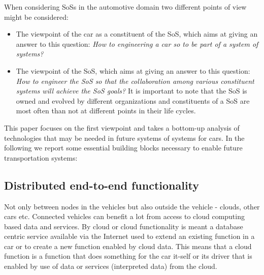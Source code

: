 \documentclass{llncs}
\begin{document}
When considering SoSs in the automotive domain two different points of view might be considered: 

\begin{itemize}
\item The viewpoint of the car as a constituent of the SoS, which aims at giving an answer to this question: {\em How to engineering a car so to be part of a system of systems?}
\item The viewpoint of the SoS, which aims at giving an answer to this question: {\em How to engineer the SoS so that the collaboration among various constituent systems will achieve the SoS goals?} It is important to note that the SoS is owned and evolved by different organizations and constituents of a SoS are most often than not at different points in their life cycles. 
\end{itemize}

This paper focuses on the first viewpoint and takes a bottom-up analysis of technologies that may be needed in future systems of systems for cars. %
In the following we report some essential building blocks necessary to enable future transportation systems:

\subsection*{Distributed end-to-end functionality} 

Not only between nodes in the vehicles but also outside the vehicle - clouds, other cars etc. Connected vehicles can benefit a lot from access to cloud computing based data and services. By cloud or cloud functionality is meant a database centric service available via the Internet used to extend an existing function in a car or to create a new function enabled by cloud data. This means that a cloud function is a function that does something for the car it-self or its driver that is enabled by use of data or services (interpreted data) from the cloud.
\end{document}
